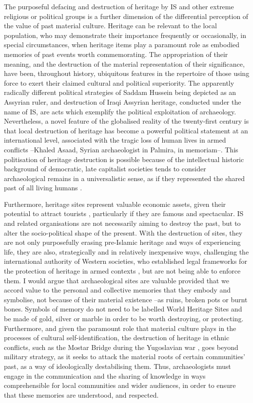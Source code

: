 		The purposeful defacing and destruction of heritage by IS and other extreme religious or political groups is a further dimension of the differential perception of the value of past material culture. Heritage can be relevant to the local population, who may demonstrate their importance frequently or occasionally, in special circumstances, when heritage items play a paramount role as embodied memories of past events worth commemorating. The appropriation of their meaning, and the destruction of the material representation of their significance, have been, throughout history, ubiquitous features in the repertoire of those using force to exert their claimed cultural and political superiority. The apparently radically different political strategies of Saddam Hussein being depicted as an Assyrian ruler, and destruction of Iraqi Assyrian heritage, conducted under the name of IS, are acts which exemplify the political exploitation of archaeology. Nevertheless, a novel feature of the globalised reality of the twenty-first century is that local destruction of heritage has become a powerful political statement at an international level, associated with the tragic loss of human lives in armed conflicts –Khaled Asaad, Syrian archaeologist in Palmira, in memoriam–. This politisation of heritage destruction is possible because of the intellectual historic background of democratic, late capitalist societies tends to consider archaeological remains in a universalistic sense, as if they represented the shared past of all living humans \parencite{Holtorf_2006}. 

Furthermore, heritage sites represent valuable economic assets, given their potential to attract tourists \parencite{Meskell_2002a}, particularly if they are famous and spectacular. IS and related organisations are not necessarily aiming to destroy the past, but to alter the socio-political shape of the present. With the destruction of sites, they are not only purposefully erasing pre-Islamic heritage and ways of experiencing life, they are also, strategically and in relatively inexpensive ways, challenging the international authority of Western societies, who established legal frameworks for the protection of heritage in armed contexts \parencite{Gerstenblith_2009}, but are not being able to enforce them. I would argue that archaeological sites are valuable provided that we accord value to the personal and collective memories that they embody and symbolise, not because of their material existence –as ruins, broken pots or burnt bones. Symbols of memory do not need to be labelled World Heritage Sites and be made of gold, silver or marble in order to be worth destroying, or protecting. Furthermore, and given the paramount role that material culture plays in the processes of cultural self-identification, the destruction of heritage in ethnic conflicts, such as the Mostar Bridge during the Yugoslavian war \parencite{Chapman_1994}, goes beyond military strategy, as it seeks to attack the material roots of certain communities’ past, as a way of ideologically destabilising them. Thus, archaeologists must engage in the communication and the sharing of knowledge in ways comprehensible for local communities and wider audiences, in order to ensure that these memories are understood, and respected.
		
